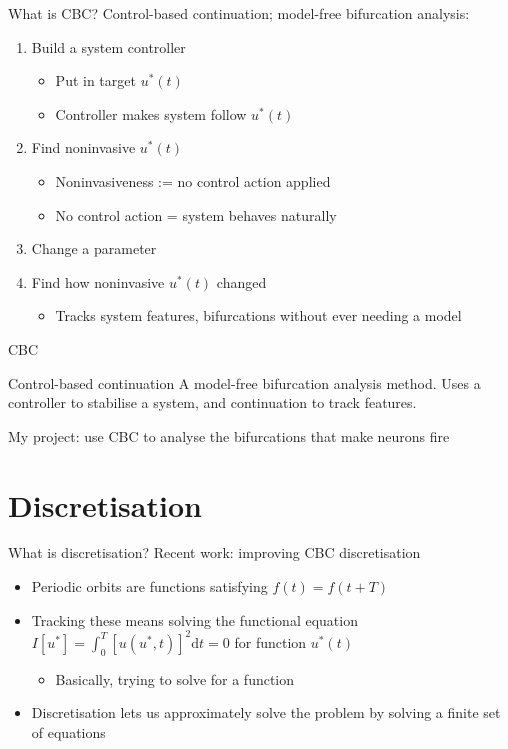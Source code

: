 \documentclass[presentation]{beamer}
\begin{document}
\begin{frame}[label={sec:orge36d34d}]{What is CBC?}
Control-based continuation; model-free bifurcation analysis:
\begin{enumerate}[<+->]
\item Build a system controller
\begin{itemize}
\item Put in target \(u^*(t)\)
\item Controller makes system follow \(u^*(t)\)
\end{itemize}
\item Find noninvasive \(u^*(t)\)
\begin{itemize}
\item Noninvasiveness := no control action applied
\item No control action = system behaves naturally
\end{itemize}
\item Change a parameter
\item Find how noninvasive \(u^*(t)\) changed
\begin{itemize}
\item Tracks system features, bifurcations without ever needing a model
\end{itemize}
\end{enumerate}
\end{frame}
\begin{frame}[label={sec:org131c5fc}]{CBC}
\begin{block}{Control-based continuation}
A model-free bifurcation analysis method. Uses a controller to stabilise a system, and continuation to track features.
\end{block}

\vfill
My project: use CBC to analyse the bifurcations that make neurons fire
\end{frame}

\section{Discretisation}
\label{sec:org8bb808e}
\begin{frame}[<+->][label={sec:org6ac1f63}]{What is discretisation?}
Recent work: improving CBC discretisation
\vfill
\begin{itemize}
\item Periodic orbits are functions satisfying \(f(t) = f(t+T)\)
\item Tracking these means solving the functional equation \(I\left[u^*\right] = \int_0^T\left[u(u^*, t)\right]^2\mathrm{d}t = 0\) for function \(u^*(t)\)
\begin{itemize}
\item Basically, trying to solve for a function
\end{itemize}
\item Discretisation lets us approximately solve the problem by solving a finite set of equations
\end{itemize}
\end{frame}
\end{document}
